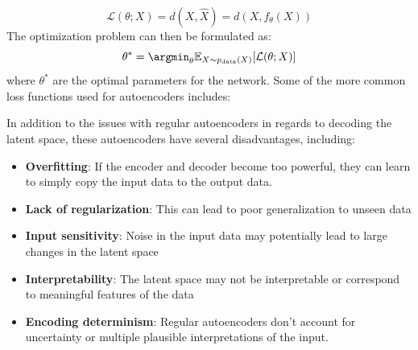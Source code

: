 \begin{equation}
    \mathcal{L}(\theta; X) = d(X, \hat{X}) = d(X, f_\theta(X))
\end{equation}
The optimization problem can then be formulated as:
\begin{equation}
    \theta^* = \argmin_{\theta} \mathbb{E}_{X \sim p_{\text{data}}(X)}[\mathcal{L}(\theta; X)]
\end{equation}
where $\theta^*$ are the optimal parameters for the network. Some of the more common loss functions used for autoencoders includes: \\

\clearpage


In addition to the issues with regular autoencoders in regards to decoding the latent space, these autoencoders have several disadvantages, including:

\begin{itemize}
    \item \textbf{Overfitting}: If the encoder and decoder become too powerful, they can learn to simply copy the input data to the output data.
    \item \textbf{Lack of regularization}: This can lead to poor generalization to unseen data
    \item \textbf{Input sensitivity}: Noise in the input data may potentially lead to large changes in the latent space
    \item \textbf{Interpretability}: The latent space may not be interpretable or correspond to meaningful features of the data
    \item \textbf{Encoding determinism}: Regular autoencoders don't account for uncertainty or multiple plausible interpretations of the input.
\end{itemize}